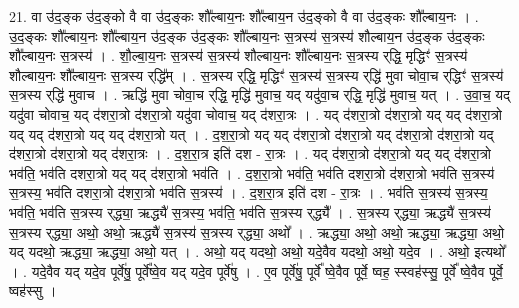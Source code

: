 \documentclass[17pt]{extarticle}
\begin{document}
21. वा उ॑द॒ङ्क उ॑द॒ङ्को वै वा उ॑द॒ङ्कः शौ᳚ल्बाय॒नः शौ᳚ल्बाय॒न उ॑द॒ङ्को वै वा उ॑द॒ङ्कः शौ᳚ल्बाय॒नः । . उ॒द॒ङ्कः शौ᳚ल्बाय॒नः शौ᳚ल्बाय॒न उ॑द॒ङ्क उ॑द॒ङ्कः शौ᳚ल्बाय॒नः स॒त्रस्य॑ स॒त्रस्य॑ शौल्बाय॒न उ॑द॒ङ्क उ॑द॒ङ्कः शौ᳚ल्बाय॒नः स॒त्रस्य॑ । . शौ॒ल्बा॒य॒नः स॒त्रस्य॑ स॒त्रस्य॑ शौल्बाय॒नः शौ᳚ल्बाय॒नः स॒त्रस्य र्‌द्धि॒ मृद्धिꣳ॑ स॒त्रस्य॑ शौल्बाय॒नः शौ᳚ल्बाय॒नः स॒त्रस्य र्‌द्धि᳚म् । . स॒त्रस्य र्‌द्धि॒ मृद्धिꣳ॑ स॒त्रस्य॑ स॒त्रस्य र्‌द्धि॑ मुवा चोवा॒च र्‌द्धिꣳ॑ स॒त्रस्य॑ स॒त्रस्य र्‌द्धि॑ मुवाच । . ऋद्धि॑ मुवा चोवा॒च र्‌द्धि॒ मृद्धि॑ मुवाच॒ यद् यदु॑वा॒च र्‌द्धि॒ मृद्धि॑ मुवाच॒ यत् । . उ॒वा॒च॒ यद् यदु॑वा चोवाच॒ यद् द॑शरा॒त्रो द॑शरा॒त्रो यदु॑वा चोवाच॒ यद् द॑शरा॒त्रः । . यद् द॑शरा॒त्रो द॑शरा॒त्रो यद् यद् द॑शरा॒त्रो यद् यद् द॑शरा॒त्रो यद् यद् द॑शरा॒त्रो यत् । . द॒श॒रा॒त्रो यद् यद् द॑शरा॒त्रो द॑शरा॒त्रो यद् द॑शरा॒त्रो द॑शरा॒त्रो यद् द॑शरा॒त्रो द॑शरा॒त्रो यद् द॑शरा॒त्रः । . द॒श॒रा॒त्र इति॑ दश - रा॒त्रः । . यद् द॑शरा॒त्रो द॑शरा॒त्रो यद् यद् द॑शरा॒त्रो भव॑ति॒ भव॑ति दशरा॒त्रो यद् यद् द॑शरा॒त्रो भव॑ति । . द॒श॒रा॒त्रो भव॑ति॒ भव॑ति दशरा॒त्रो द॑शरा॒त्रो भव॑ति स॒त्रस्य॑ स॒त्रस्य॒ भव॑ति दशरा॒त्रो द॑शरा॒त्रो भव॑ति स॒त्रस्य॑ । . द॒श॒रा॒त्र इति॑ दश - रा॒त्रः । . भव॑ति स॒त्रस्य॑ स॒त्रस्य॒ भव॑ति॒ भव॑ति स॒त्रस्य र्‌द्ध्या॒ ऋद्ध्यै॑ स॒त्रस्य॒ भव॑ति॒ भव॑ति स॒त्रस्य र्‌द्ध्यै᳚ । . स॒त्रस्य र्‌द्ध्या॒ ऋद्ध्यै॑ स॒त्रस्य॑ स॒त्रस्य र्‌द्ध्या॒ अथो॒ अथो॒ ऋद्ध्यै॑ स॒त्रस्य॑ स॒त्रस्य र्‌द्ध्या॒ अथो᳚ । . ऋद्ध्या॒ अथो॒ अथो॒ ऋद्ध्या॒ ऋद्ध्या॒ अथो॒ यद् यदथो॒ ऋद्ध्या॒ ऋद्ध्या॒ अथो॒ यत् । . अथो॒ यद् यदथो॒ अथो॒ यदे॒वैव यदथो॒ अथो॒ यदे॒व । . अथो॒ इत्यथो᳚ । . यदे॒वैव यद् यदे॒व पूर्वे॑षु॒ पूर्वे᳚ष्वे॒व यद् यदे॒व पूर्वे॑षु । . ए॒व पूर्वे॑षु॒ पूर्वे᳚ ष्वे॒वैव पूर्वे॒ ष्वह॒ स्स्वह॑स्सु॒ पूर्वे᳚ ष्वे॒वैव पूर्वे॒ ष्वह॑स्सु । \newline
\end{document}
